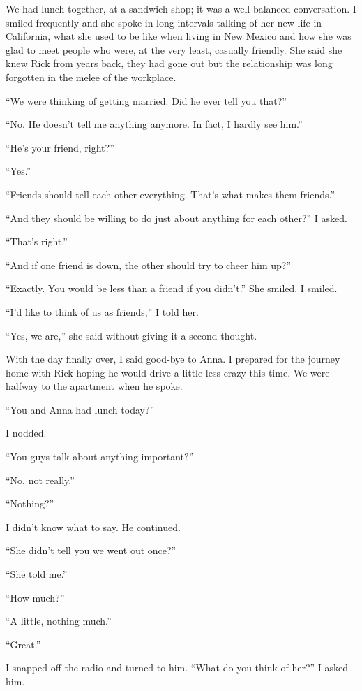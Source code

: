 We had lunch together, at a sandwich shop; it was a well-balanced
conversation. I smiled frequently and she spoke in long intervals
talking of her new life in California, what she used to be like when
living in New Mexico and how she was glad to meet people who were, at
the very least, casually friendly. She said she knew Rick from years
back, they had gone out but the relationship was long forgotten in the
melee of the workplace.

``We were thinking of getting married. Did he ever tell you that?''

``No. He doesn't tell me anything anymore. In fact, I hardly see him.''

``He's your friend, right?''

``Yes.''

``Friends should tell each other everything. That's what makes them
friends.''

``And they should be willing to do just about anything for each other?''
I asked.

``That's right.''

``And if one friend is down, the other should try to cheer him up?''

``Exactly. You would be less than a friend if you didn't.'' She smiled.
I smiled.

``I'd like to think of us as friends,'' I told her.

``Yes, we are,'' she said without giving it a second thought.

With the day finally over, I said good-bye to Anna. I prepared for the
journey home with Rick hoping he would drive a little less crazy this
time. We were halfway to the apartment when he spoke.

``You and Anna had lunch today?''

I nodded.

``You guys talk about anything important?''

``No, not really.''

``Nothing?''

I didn't know what to say. He continued.

``She didn't tell you we went out once?''

``She told me.''

``How much?''

``A little, nothing much.''

``Great.''

I snapped off the radio and turned to him. ``What do you think of her?''
I asked him.

